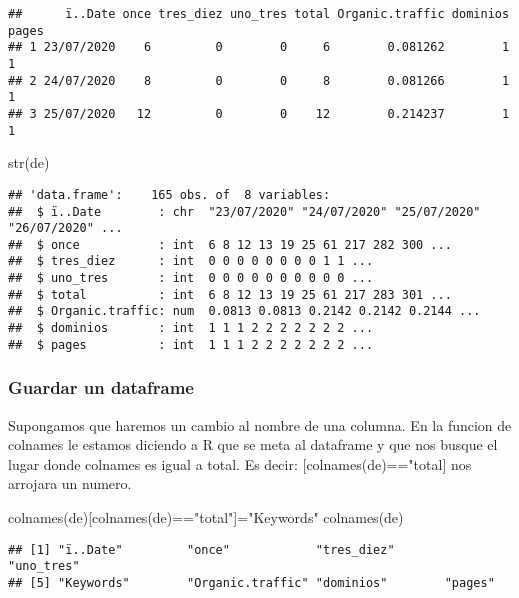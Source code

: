 \documentclass[
]{article}
\newenvironment{Shaded}{\begin{snugshade}}{\end{snugshade}}
\newcommand{\FunctionTok}[1]{\textcolor[rgb]{0.00,0.00,0.00}{#1}}
\newcommand{\NormalTok}[1]{#1}
\newcommand{\OtherTok}[1]{\textcolor[rgb]{0.56,0.35,0.01}{#1}}
\newcommand{\SpecialCharTok}[1]{\textcolor[rgb]{0.00,0.00,0.00}{#1}}
\newcommand{\StringTok}[1]{\textcolor[rgb]{0.31,0.60,0.02}{#1}}
\begin{document}
\begin{verbatim}
##      ï..Date once tres_diez uno_tres total Organic.traffic dominios pages
## 1 23/07/2020    6         0        0     6        0.081262        1     1
## 2 24/07/2020    8         0        0     8        0.081266        1     1
## 3 25/07/2020   12         0        0    12        0.214237        1     1
\end{verbatim}

\begin{Shaded}
\begin{Highlighting}[]
\FunctionTok{str}\NormalTok{(de)}
\end{Highlighting}
\end{Shaded}

\begin{verbatim}
## 'data.frame':    165 obs. of  8 variables:
##  $ ï..Date        : chr  "23/07/2020" "24/07/2020" "25/07/2020" "26/07/2020" ...
##  $ once           : int  6 8 12 13 19 25 61 217 282 300 ...
##  $ tres_diez      : int  0 0 0 0 0 0 0 0 1 1 ...
##  $ uno_tres       : int  0 0 0 0 0 0 0 0 0 0 ...
##  $ total          : int  6 8 12 13 19 25 61 217 283 301 ...
##  $ Organic.traffic: num  0.0813 0.0813 0.2142 0.2142 0.2144 ...
##  $ dominios       : int  1 1 1 2 2 2 2 2 2 2 ...
##  $ pages          : int  1 1 1 2 2 2 2 2 2 2 ...
\end{verbatim}

\hypertarget{guardar-un-dataframe}{%
\subsubsection{Guardar un dataframe}\label{guardar-un-dataframe}}

Supongamos que haremos un cambio al nombre de una columna. En la funcion
de colnames le estamos diciendo a R que se meta al dataframe y que nos
busque el lugar donde colnames es igual a total. Es decir:
{[}colnames(de)=="total{]} nos arrojara un numero.

\begin{Shaded}
\begin{Highlighting}[]
\FunctionTok{colnames}\NormalTok{(de)[}\FunctionTok{colnames}\NormalTok{(de)}\SpecialCharTok{==}\StringTok{"total"}\NormalTok{]}\OtherTok{=}\StringTok{"Keywords"}
\FunctionTok{colnames}\NormalTok{(de)}
\end{Highlighting}
\end{Shaded}

\begin{verbatim}
## [1] "ï..Date"         "once"            "tres_diez"       "uno_tres"       
## [5] "Keywords"        "Organic.traffic" "dominios"        "pages"
\end{verbatim}
\end{document}
